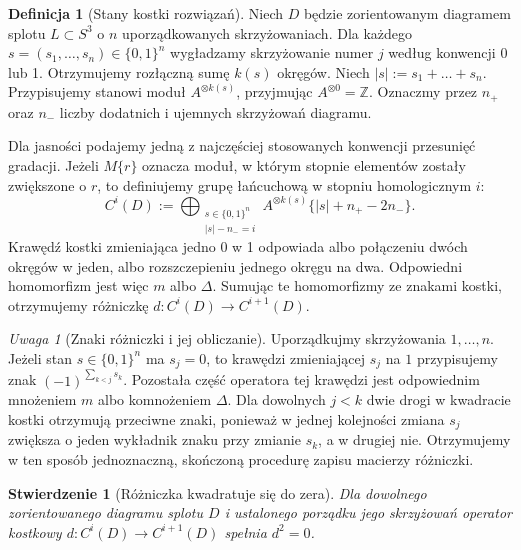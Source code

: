 \documentclass[11pt,a4paper]{report}
\numberwithin{equation}{section}
\theoremstyle{plain}
\newtheorem{stwierdzenie}[twierdzenie]{Stwierdzenie}
\theoremstyle{definition}
\newtheorem{definicja}[twierdzenie]{Definicja}
\theoremstyle{remark}
\newtheorem{uwaga}[twierdzenie]{Uwaga}
\begin{document}
\begin{definicja}[Stany kostki rozwiązań]
Niech $D$ będzie zorientowanym diagramem splotu
$L\subset S^3$ o $n$ uporządkowanych skrzyżowaniach.
Dla każdego $s=(s_1,\dots,s_n)\in\{0,1\}^n$
wygładzamy skrzyżowanie numer $j$ według konwencji
0 lub 1. Otrzymujemy rozłączną sumę $k(s)$ okręgów.
Niech $|s|:=s_1+\dots+s_n$.
Przypisujemy stanowi moduł $A^{\otimes k(s)}$, przyjmując
$A^{\otimes0}=\mathbb Z$. Oznaczmy przez $n_+$ oraz $n_-$
liczby dodatnich i ujemnych skrzyżowań diagramu.
\end{definicja}

Dla jasności podajemy jedną z najczęściej stosowanych
konwencji przesunięć gradacji. Jeżeli $M\{r\}$ oznacza
moduł, w którym stopnie elementów zostały zwiększone o $r$,
to definiujemy grupę łańcuchową w stopniu homologicznym $i$:
\[
C^{i}(D):=
\bigoplus_{\substack{s\in\{0,1\}^n\\|s|-n_-=i}}
A^{\otimes k(s)}\{|s|+n_+-2n_-\}.
\]
Krawędź kostki zmieniająca jedno 0 w 1 odpowiada
albo połączeniu dwóch okręgów w jeden, albo rozszczepieniu
jednego okręgu na dwa. Odpowiedni homomorfizm jest więc
$m$ albo $\Delta$. Sumując te homomorfizmy ze znakami
kostki, otrzymujemy różniczkę $d\colon C^i(D)\to C^{i+1}(D)$.

\begin{uwaga}[Znaki różniczki i jej obliczanie]
Uporządkujmy skrzyżowania $1,\dots,n$. Jeżeli stan
$s\in\{0,1\}^n$ ma $s_j=0$, to krawędzi zmieniającej
$s_j$ na $1$ przypisujemy znak
$(-1)^{\sum_{k<j}s_k}$. Pozostała część operatora tej
krawędzi jest odpowiednim mnożeniem $m$ albo
komnożeniem $\Delta$. Dla dowolnych $j<k$ dwie
drogi w kwadracie kostki otrzymują przeciwne znaki,
ponieważ w jednej kolejności zmiana $s_j$ zwiększa
o jeden wykładnik znaku przy zmianie $s_k$, a w drugiej
nie. Otrzymujemy w ten sposób jednoznaczną, skończoną
procedurę zapisu macierzy różniczki.
\end{uwaga}

\begin{stwierdzenie}[Różniczka kwadratuje się do zera]
Dla dowolnego zorientowanego diagramu splotu $D$ i ustalonego
porządku jego skrzyżowań operator kostkowy
$d:C^i(D)\to C^{i+1}(D)$ spełnia $d^2=0$.
\end{stwierdzenie}
\end{document}
